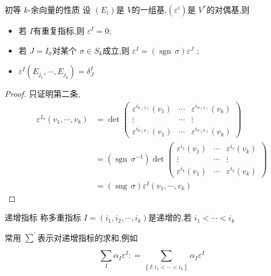 \documentclass[../../几何与拓扑.tex]{subfiles}
\begin{document}
\begin{lemma}{初等 $ k $-余向量的性质 }\label{e-tensor-property}
    设 $ \left( E_{i} \right)  $是 $ V $的一组基,$ \left( \varepsilon^{i} \right)  $是 $ V^{*} $的对偶基,则 
    \begin{itemize}
        \item 若 $ I $有重复指标,则 $ \varepsilon^{I}= 0 $;
        \item 若 $ J=I_{\sigma} $对某个 $ \sigma \in S_{k} $成立,则 $ \varepsilon^{I}= \left( \operatorname{sgn}\,\sigma \right) \varepsilon^{J}  $   ;
        \item  $
        \varepsilon^{I}\left( E_{j_1},\cdots ,E_{j_{k}} \right) = \delta _{J}^{I} 
        $
    \end{itemize}
\end{lemma}
\begin{proof}
    只证明第二条,$$
    \begin{aligned}
    \varepsilon^{I_{\sigma}} \left( v_1,\cdots ,v_{k} \right)& =  \det\begin{pmatrix}\varepsilon^{i_{\sigma\left( 1 \right) } }\left(v_1\right)&\cdots&\varepsilon^{i_{\sigma\left( 1 \right) }}\left(v_k\right)\\\vdots&\cdots&\vdots\\\varepsilon^{i_{\sigma\left( k \right) }}\left(v_1\right)&\cdots&\varepsilon^{i_{\sigma\left( k \right) }}\left(v_k\right)\end{pmatrix} \\ 
     & = \left( \operatorname{sgn}\, \sigma^{-1}  \right) \det\begin{pmatrix}\varepsilon^{i_1}\left(v_1\right)&\cdots&\varepsilon^{i_1}\left(v_k\right)\\\vdots&\cdots&\vdots\\\varepsilon^{i_k}\left(v_1\right)&\cdots&\varepsilon^{i_k}\left(v_k\right)\end{pmatrix}\\ 
      & = \left( \operatorname{sng}\,\sigma \right) \varepsilon^{I}\left( v_1,\cdots ,v_{k} \right)  
    \end{aligned}
    $$
\end{proof}
\begin{definition}{递增指标}
    称多重指标 $ I = \left( i_1,i_2,\cdots,i_k \right)  $是递增的,若 $ i_1<\cdots <i_{k} $  
\end{definition}
\begin{remark}
    常用 $ \sum^{\prime}  $表示对递增指标的求和,例如 $$
    \sum_{I}^{^{\prime} } \alpha_{I} \varepsilon^{I} : = \sum_{\left\{ I:i_1<\cdots <i_{k} \right\}} \alpha_{I} \varepsilon^{I}
    $$ 
\end{remark}
\end{document}
